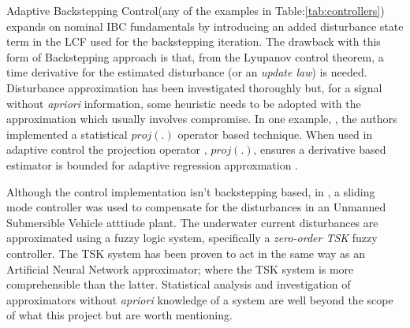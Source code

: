 \par
Adaptive Backstepping Control\cite{backstepping}(any of the examples in Table:\ref{tab:controllers}) expands on nominal IBC fundamentals by introducing an added disturbance state term in the LCF used for the backstepping iteration. The drawback with this form of Backstepping approach is that, from the Lyupanov control theorem, a time derivative for the estimated disturbance (or an \emph{update law}) is needed. Disturbance approximation has been investigated thoroughly but, for a signal without \emph{apriori} information, some heuristic needs to be adopted with the approximation which usually involves compromise. In one example, \cite{nonlinearadaptive}, the authors implemented a statistical $proj(.)$ operator based technique. When used in adaptive control the projection operator \cite{outputfeedback}, $proj(.)$, ensures a derivative based estimator is bounded for adaptive regression approxmation \cite{nonlinearregression}.
\par
Although the control implementation isn't backstepping based, in \cite{adaptiveslidingmode}, a sliding mode controller was used to compensate for the disturbances in an Unmanned Submersible Vehicle atttiude plant. The underwater current disturbances are approximated using a fuzzy logic system, specifically a \emph{zero-order TSK} fuzzy controller. The TSK system has been proven to act in the same way as an Artificial Neural Network approximator\cite{zeroTSK}; where the TSK system is more comprehensible than the latter. Statistical analysis and investigation of approximators without \emph{apriori} knowledge of a system are well beyond the scope of what this project but are worth mentioning.
